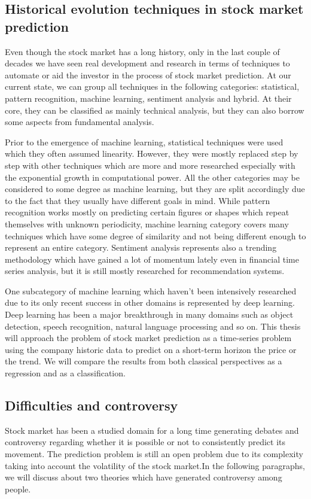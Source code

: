 \subsection{Historical evolution techniques in stock market prediction}
Even though the stock market has a long history, only in the last couple of decades we have seen real development and research in terms of techniques to automate or aid the investor in the process of stock market prediction. At our current state, we can group all techniques in the following categories: statistical, pattern recognition, machine learning, sentiment analysis and hybrid.\cite{shah2019stock} At their core, they can be classified as mainly technical analysis, but they can also borrow some aspects from fundamental analysis.

Prior to the emergence of machine learning, statistical techniques were used which they often assumed linearity. However, they were mostly replaced step by step with other techniques which are more and more researched especially with the exponential growth in computational power. All the other categories may be considered to some degree as machine learning, but they are split accordingly due to the fact that they usually have different goals in mind. While pattern recognition works mostly on predicting certain figures or shapes which repeat themselves with unknown periodicity, machine learning category covers many techniques which have some degree of similarity and not being different enough to represent an entire category. Sentiment analysis represents also a trending methodology which have gained a lot of momentum lately even in financial time series analysis, but it is still mostly researched for recommendation systems.

One subcategory of machine learning which haven't been intensively researched due to its only recent success in other domains is represented by deep learning. Deep learning has been a major breakthrough in many domains such as object detection, speech recognition, natural language processing and so on. This thesis will approach the problem of stock market prediction as a time-series problem using the company historic data to predict on a short-term horizon the price or the trend. We will compare the results from both classical perspectives as a regression and as a classification.

\subsection{Difficulties and controversy}
Stock market has been a studied domain for a long time generating debates and controversy regarding whether it is possible or not to consistently predict its movement. The prediction problem is still an open problem due to its complexity taking into account the volatility of the stock market.In the following paragraphs, we will discuss about two theories which have generated controversy among people.

